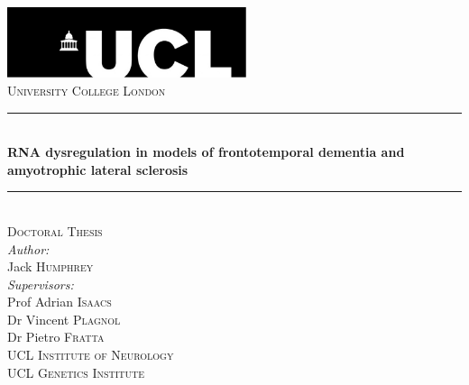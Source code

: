 
\begin{titlepage}%
\newcommand{\HRule}{\rule{\linewidth}{0.5mm}}

\center 

\includegraphics[width=7cm]{Figures/misc/ucllogo.jpg}\\[1cm]
\textsc{\LARGE University College London}\\[2cm] %
\HRule \\[1cm]
{ \huge \bfseries RNA dysregulation in models of frontotemporal dementia and amyotrophic lateral sclerosis}\\[0.4cm] 
\HRule \\[2cm]


\textsc{\Large Doctoral Thesis}\\[1.5cm] %


\emph{Author:}\\
Jack \textsc{Humphrey}\\[1cm] %

\emph{Supervisors:} \\
Prof Adrian \textsc{Isaacs}\\ 
Dr Vincent \textsc{Plagnol}\\ 
Dr Pietro \textsc{Fratta}\\[1cm]


\textsc{\Large UCL Institute of Neurology}\\[0.5cm] %
\textsc{\Large UCL Genetics Institute}\\[2cm] %




\vfill %

\end{titlepage}%
\cleardoublepage

